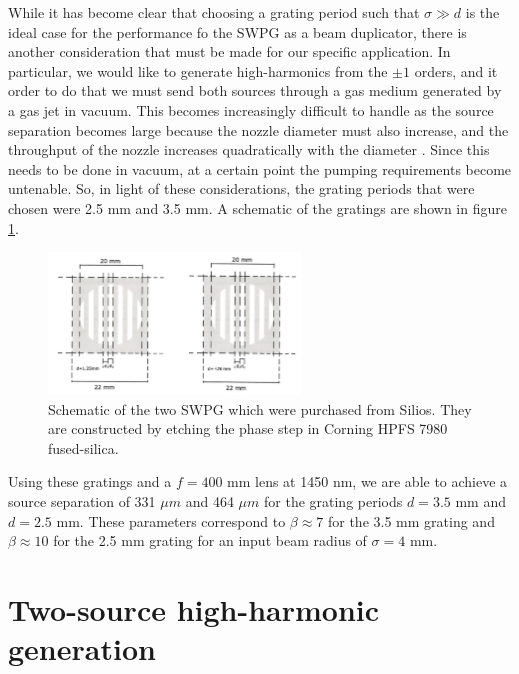 While it has become clear that choosing a grating period such that $\sigma\gg d$ is the ideal case for the performance fo the SWPG as a beam duplicator, there is another consideration that must be made for our specific application.  In particular, we would like to generate high-harmonics from the $\pm1$ orders, and it order to do that we must send both sources through a gas medium generated by a gas jet in vacuum.  This becomes increasingly difficult to handle as the source separation becomes large because the nozzle diameter must also increase, and the throughput of the nozzle increases quadratically with the diameter \cite{scolesAtomicMolecularBeam1988}.  Since this needs to be done in vacuum, at a certain point the pumping requirements become untenable.  So, in light of these considerations, the grating periods that were chosen were 2.5 mm and 3.5 mm.  A schematic of the gratings are shown in figure \ref{fig:silios_sketch}.
\begin{figure}
	\centering
	\includegraphics[width=0.6\textwidth]{figures/Two_source/silios_sketch.png}
	\caption[Drawing of SWPGs purchased from Silios]{Schematic of the two SWPG which were purchased from Silios.  They are constructed by etching the phase step in Corning HPFS 7980 fused-silica.}
	\label{fig:silios_sketch}
\end{figure}
Using these gratings and a $f=400$ mm lens at 1450 nm, we are able to achieve a source separation of 331 $\mu m$ and 464 $\mu m$ for the grating periods $d=3.5$ mm and $d=2.5$ mm.  These parameters correspond to $\beta\approx7$ for the 3.5 mm grating and $\beta\approx10$ for the 2.5 mm grating for an input beam radius of $\sigma=4$ mm.

\section{Two-source high-harmonic generation}

